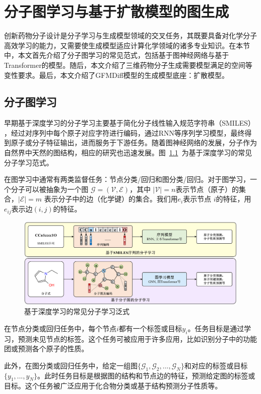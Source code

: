 \chapter{分子图学习与基于扩散模型的图生成}
\label{chap:diffusion-based_molgen}
创新药物分子设计是分子学习与生成模型领域的交叉任务，其既要具备对化学分子高效学习的能力，又需要使生成模型适应计算化学领域的诸多专业知识。在本节中，本文首先介绍了分子图学习的常见范式，包括基于图神经网络与基于Transformer的模型。随后，本文介绍了三维药物分子生成需要模型满足的空间等变性要求。最后，本文介绍了GFMDiff模型的生成模型底座：扩散模型。

\section{分子图学习}
早期基于深度学习的分子学习主要基于简化分子线性输入规范字符串（SMILES） \cite{smiles_weinberger_88}，经过对序列中每个原子对应字符进行编码，通过RNN等序列学习模型，最终得到原子或分子特征输出，进而服务于下游任务。随着图神经网络的发展，分子作为自然界中天然的图结构，相应的研究也迅速发展。图~\ref{fig:molecularlearning}~为基于深度学习的常见分子学习范式。

在图学习中通常有两类监督任务：节点分类/回归和图分类/回归。对于图学习，一个分子可以被抽象为一个图 $\mathcal{G} = (\mathcal{V}, \mathcal{E})$，其中 $|\mathcal{V}| = n$表示节点（原子）的集合，$|\mathcal{E}| = m$ 表示分子中的边（化学键）的集合。我们用$e_i$表示节点 $i$的特征，用$e_{ij}$表示边$(i, j)$的特征。

\begin{figure}[h]
    \centering
    \includegraphics[width=\linewidth]{figures/molecular_learning.png}
    \caption{基于深度学习的常见分子学习泛式}
    \label{fig:molecularlearning}
\end{figure} 

在节点分类或回归任务中，每个节点$i$都有一个标签或目标$y_i$。任务目标是通过学习，预测未见节点的标签。这个任务可被应用于许多应用，比如识别分子中的功能团或预测各个原子的性质。

此外，在图分类或回归任务中，给定一组图$\{ \mathcal{G}_1, \mathcal{G}_2, ..., \mathcal{G}_N \}$和对应的标签或目标 $\{ y_1, ..., y_N \}$。此时任务目标是根据图的结构和节点边的特征，预测给定图的标签或目标。这个任务被广泛应用于化合物分类或基于结构预测分子性质等。

